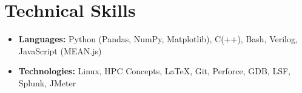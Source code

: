 \documentclass[11pt,letterpaper,sans]{moderncv}
\begin{document}
\section{Technical Skills}


\begin{itemize}
\item[]  \textbf{Languages:} Python (Pandas, NumPy, Matplotlib), C(++), Bash, Verilog, JavaScript (MEAN.js)
\vspace{3pt}
\item[]  \textbf{Technologies:} Linux, HPC Concepts, LaTeX, Git, Perforce, GDB, LSF, Splunk, JMeter

\end{itemize}


%
%


\end{document}

